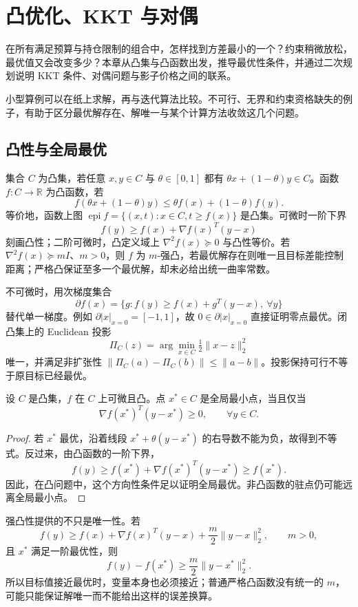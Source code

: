 \chapter{凸优化、KKT 与对偶}
\label{ch:convex-optimization}

在所有满足预算与持仓限制的组合中，怎样找到方差最小的一个？约束稍微放松，最优值又会改变多少？本章从凸集与凸函数出发，推导最优性条件，并通过二次规划说明 KKT 条件、对偶问题与影子价格之间的联系。

小型算例可以在纸上求解，再与迭代算法比较。不可行、无界和约束资格缺失的例子，有助于区分最优解存在、解唯一与某个计算方法收敛这几个问题。

\section{凸性与全局最优}

集合 $C$ 为凸集，若任意 $x,y\in C$ 与 $\theta\in[0,1]$ 都有 $\theta x+(1-\theta)y\in C$。函数 $f:C\to\mathbb R$ 为凸函数，若
\[
f(\theta x+(1-\theta)y)\le \theta f(x)+(1-\theta)f(y).
\]
等价地，函数上图 $\operatorname{epi}f=\{(x,t):x\in C,t\ge f(x)\}$ 是凸集。可微时一阶下界
\[
f(y)\ge f(x)+\nabla f(x)^T(y-x)
\]
刻画凸性；二阶可微时，凸定义域上 $\nabla^2f(x)\succeq0$ 与凸性等价。若 $\nabla^2f(x)\succeq mI$、$m>0$，则 $f$ 为 $m$-强凸，若最优解存在则唯一且目标差能控制距离；严格凸保证至多一个最优解，却未必给出统一曲率常数。

不可微时，用次梯度集合
\[
\partial f(x)=\{g:f(y)\ge f(x)+g^T(y-x),\ \forall y\}
\]
替代单一梯度。例如 $\partial|x|_{x=0}=[-1,1]$，故 $0\in\partial|x|_{x=0}$ 直接证明零点最优。闭凸集上的 Euclidean 投影
\[
\Pi_C(z)=\arg\min_{x\in C}\tfrac12\|x-z\|_2^2
\]
唯一，并满足非扩张性 $\|\Pi_C(a)-\Pi_C(b)\|\le\|a-b\|$。投影保持可行不等于原目标已经最优。

\begin{proposition}[凸目标的一阶最优性]
设 $C$ 是凸集，$f$ 在 $C$ 上可微且凸。点 $x^*\in C$ 是全局最小点，当且仅当
\[
  \nabla f(x^*)^T(y-x^*)\ge0,\qquad\forall y\in C.
\]
\end{proposition}
\begin{proof}
若 $x^*$ 最优，沿着线段 $x^*+\theta(y-x^*)$ 的右导数不能为负，故得到不等式。反过来，由凸函数的一阶下界，
\[
f(y)\ge f(x^*)+\nabla f(x^*)^T(y-x^*)\ge f(x^*).
\]
因此，在凸问题中，这个方向性条件足以证明全局最优。非凸函数的驻点仍可能远离全局最小点。
\end{proof}

强凸性提供的不只是唯一性。若
\[
 f(y)\ge f(x)+\nabla f(x)^T(y-x)+\frac m2\|y-x\|_2^2,
 \qquad m>0,
\]
且 $x^*$ 满足一阶最优性，则
\[
  f(y)-f(x^*)\ge \frac m2\|y-x^*\|_2^2.
\]
所以目标值接近最优时，变量本身也必须接近；普通严格凸函数没有统一的 $m$，可能只能保证解唯一而不能给出这样的误差换算。


